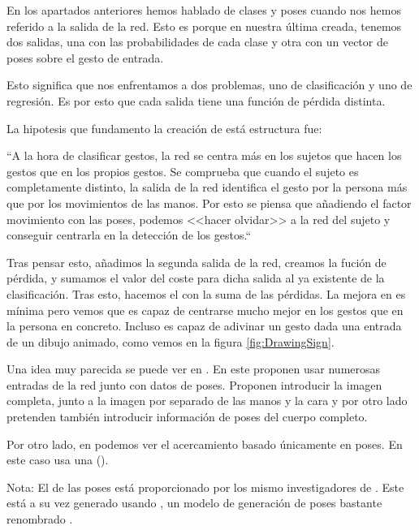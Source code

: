 En los apartados anteriores hemos hablado de clases y poses cuando nos hemos referido a la salida de la red. Esto es porque en nuestra última  creada, tenemos dos salidas, una con las probabilidades de cada clase y otra con un vector de poses sobre el gesto de entrada.

Esto significa que nos enfrentamos a dos problemas, uno de clasificación y uno de regresión. Es por esto que cada salida tiene una función de pérdida distinta.

La hipotesis que fundamento la creación de está estructura fue:

``A la hora de clasificar gestos, la red  se centra más en los sujetos que hacen los gestos que en los propios gestos. Se comprueba que cuando el sujeto es completamente distinto, la salida de la red identifica el gesto por la persona más que por los movimientos de las manos. Por esto se piensa que añadiendo el factor movimiento con las poses, podemos <<hacer olvidar>> a la red del sujeto y conseguir centrarla en la detección de los gestos.``

Tras pensar esto, añadimos la segunda salida de la red, creamos la fución de pérdida, y sumamos el valor del coste para dicha salida al ya existente de la clasificación. Tras esto, hacemos el  con la suma de las pérdidas. La mejora en  es mínima pero vemos que es capaz de centrarse mucho mejor en los gestos que en la persona en concreto. Incluso es capaz de adivinar un gesto dada una entrada de un dibujo animado, como vemos en la figura \ref{fig:DrawingSign}.


Una idea muy parecida se puede ver en . En este  proponen usar numerosas entradas de la red junto con datos de poses. Proponen introducir la imagen completa, junto a la imagen por separado de las manos y la cara y por otro lado pretenden también introducir información de poses del cuerpo completo.

Por otro lado, en  podemos ver el acercamiento basado únicamente en poses. En este caso usa una  ().

Nota: El  de las poses está proporcionado por los mismo investigadores de  . Este  está a su vez generado usando , un modelo de generación de poses bastante renombrado .

